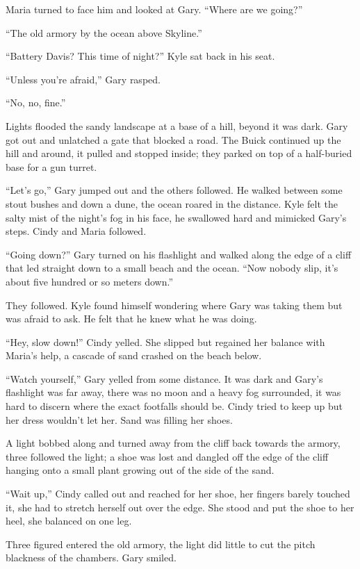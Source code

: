 \documentclass[
]{article}
\begin{document}
Maria turned to face him and looked at Gary. ``Where are we going?''

``The old armory by the ocean above Skyline.''

``Battery Davis? This time of night?'' Kyle sat back in his seat.

``Unless you're afraid,'' Gary rasped.

``No, no, fine.''

Lights flooded the sandy landscape at a base of a hill, beyond it was
dark. Gary got out and unlatched a gate that blocked a road. The Buick
continued up the hill and around, it pulled and stopped inside; they
parked on top of a half-buried base for a gun turret.

``Let's go,'' Gary jumped out and the others followed. He walked between
some stout bushes and down a dune, the ocean roared in the distance.
Kyle felt the salty mist of the night's fog in his face, he swallowed
hard and mimicked Gary's steps. Cindy and Maria followed.

``Going down?'' Gary turned on his flashlight and walked along the edge
of a cliff that led straight down to a small beach and the ocean. ``Now
nobody slip, it's about five hundred or so meters down.''

They followed. Kyle found himself wondering where Gary was taking them
but was afraid to ask. He felt that he knew what he was doing.

``Hey, slow down!'' Cindy yelled. She slipped but regained her balance
with Maria's help, a cascade of sand crashed on the beach below.

``Watch yourself,'' Gary yelled from some distance. It was dark and
Gary's flashlight was far away, there was no moon and a heavy fog
surrounded, it was hard to discern where the exact footfalls should be.
Cindy tried to keep up but her dress wouldn't let her. Sand was filling
her shoes.

A light bobbed along and turned away from the cliff back towards the
armory, three followed the light; a shoe was lost and dangled off the
edge of the cliff hanging onto a small plant growing out of the side of
the sand.

``Wait up,'' Cindy called out and reached for her shoe, her fingers
barely touched it, she had to stretch herself out over the edge. She
stood and put the shoe to her heel, she balanced on one leg.

Three figured entered the old armory, the light did little to cut the
pitch blackness of the chambers. Gary smiled.
\end{document}
